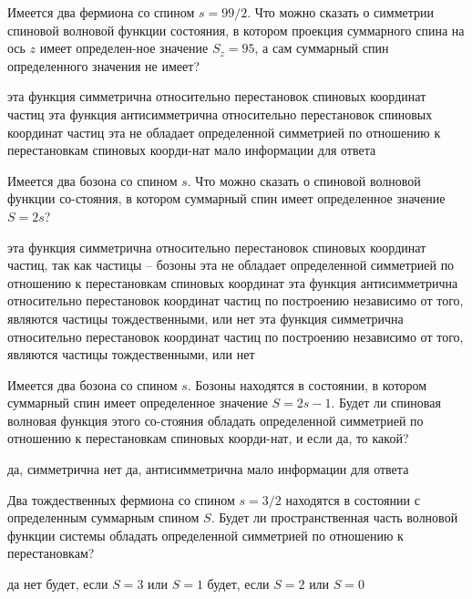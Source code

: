 \documentclass[11pt,a4paper]{exam}
\begin{document}
\begin{questions}
\question Имеется два фермиона со спином $s = 99/2$. Что можно сказать о симметрии спиновой волновой функции состояния, в котором проекция суммарного спина на ось $z$ имеет определен-ное значение ${S_z} = 95$, а сам суммарный спин определенного значения не имеет? 
\begin{choices}
\choice эта функция симметрична относительно перестановок спиновых координат частиц
\choice эта функция антисимметрична относительно перестановок спиновых координат частиц
\choice эта не обладает определенной симметрией по отношению к перестановкам спиновых коорди-нат
\choice мало информации для ответа
\end{choices}

\question Имеется два бозона со спином $s$. Что можно сказать о спиновой волновой функции со-стояния, в котором суммарный спин имеет определенное значение $S = 2s$?
\begin{choices}
\choice эта функция симметрична относительно перестановок спиновых координат частиц, так как частицы – бозоны
\choice эта не обладает определенной симметрией по отношению к перестановкам спиновых координат 
\choice эта функция антисимметрична относительно перестановок координат частиц по построению независимо от того, являются частицы тождественными, или нет
\choice эта функция симметрична относительно перестановок координат частиц по построению независимо от того, являются частицы тождественными, или нет
\end{choices}

\question Имеется два бозона со спином $s$. Бозоны находятся в состоянии, в котором суммарный спин имеет определенное значение $S = 2s - 1$. Будет ли спиновая волновая функция этого со-стояния обладать определенной симметрией по отношению к перестановкам спиновых коорди-нат, и если да, то какой?
\begin{choices}
\choice да, симметрична         
\choice нет
\choice да, антисимметрична     
\choice мало информации для ответа
\end{choices}

\question Два тождественных фермиона со спином $s = 3/2$ находятся в состоянии с определенным суммарным спином $S$. Будет ли пространственная часть волновой функции системы обладать определенной симметрией по отношению к перестановкам?
\begin{choices}
\choice да             
\choice нет
\choice будет, если $S = 3$ или $S = 1$  
\choice будет, если $S = 2$ или $S = 0$
\end{choices}


\end{questions}
\end{document}
